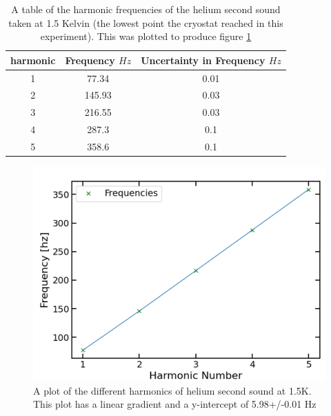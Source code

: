 \documentclass[a4paper,11pt]{article}
\begin{document}
\begin{table}[hbt!]
    \centering
    \begin{tabular}{|c|c|c|}
         \hline
         harmonic & Frequency $Hz$ & Uncertainty in Frequency $Hz$ \\
         \hline
         1 & 77.34 & 0.01 \\
         2 & 145.93 & 0.03\\
         3 & 216.55 & 0.03\\
         4 & 287.3 & 0.1\\
         5 & 358.6 & 0.1 \\
         \hline
    \end{tabular}
    \caption{A table of the harmonic frequencies of the helium second sound taken at 1.5 Kelvin (the lowest point the cryostat reached in this experiment). This was plotted to produce figure \ref{fig: 5_Harmonics_Plot}}
    \label{tab: 5_Harmonics_table}
\end{table}
\begin{figure}[hbt!]
    \centering
    \includegraphics[scale=0.8]{Picture 6.png}
    \caption{A plot of the different harmonics of helium second sound at 1.5K. This plot has a linear gradient and a y-intercept of 5.98+/-0.01 Hz}
    \label{fig: 5_Harmonics_Plot}
\end{figure}
\end{document}
